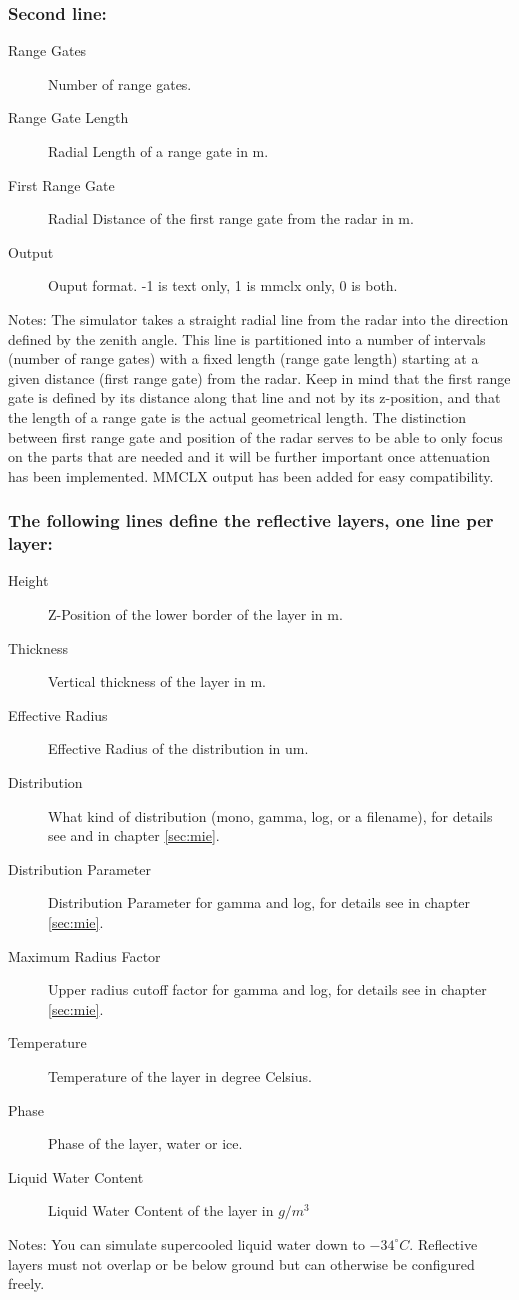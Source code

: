 \subsubsection{Second line:}
\begin{description}
\item[Range Gates] Number of range gates.
\item[Range Gate Length] Radial Length of a range gate in m.
\item[First Range Gate] Radial Distance of the first range gate from the radar in m.
\item[Output] Ouput format. -1 is text only, 1 is mmclx only, 0 is both.
\end{description}
Notes: The simulator takes a straight radial line from the radar into the direction defined
by the zenith angle. This line is partitioned into a number of intervals (number of 
range gates) with a fixed length (range gate length) starting at a given distance 
(first range gate) from the radar. Keep in mind that the first range gate is defined by 
its distance along that line and not by its z-position, and that the length of a range
gate is the actual geometrical length. The distinction between first range gate and position
of the radar serves to be able to only focus on the parts that are needed and it will be
further important once attenuation has been implemented. MMCLX output has been added for
easy compatibility.
\subsubsection{The following lines define the reflective layers, one line per layer:}
\begin{description}
\item[Height] Z-Position of the lower border of the layer in m.
\item[Thickness] Vertical thickness of the layer in m.
\item[Effective Radius] Effective Radius of the distribution in um.
\item[Distribution] What kind of distribution (mono, gamma, log, or a filename), for
details see  and  in chapter \ref{sec:mie}.
\item[Distribution Parameter] Distribution Parameter for gamma and log, for
details see  in chapter \ref{sec:mie}.
\item[Maximum Radius Factor] Upper radius cutoff factor for gamma and log, for
details see  in chapter \ref{sec:mie}.
\item[Temperature] Temperature of the layer in degree Celsius.
\item[Phase] Phase of the layer, water or ice.
\item[Liquid Water Content] Liquid Water Content of the layer in $g/m^3$
\end{description}
Notes: You can simulate supercooled liquid water down to $-34^{\circ}C$.
Reflective layers must not overlap or be below ground but can otherwise be 
configured freely. 

